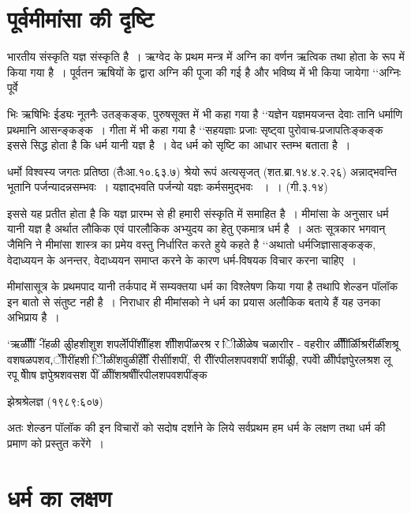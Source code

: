 {\section*{पूर्वमीमांसा की दृष्टि}

भारतीय संस्कृति यज्ञ संस्कृति है~। ऋग्वेद के प्रथम मन्त्र में अग्नि का वर्णन ऋत्विक तथा होता के रूप में किया गया है~। पूर्वतन ऋषियों के द्वारा अग्नि की पूजा की गई है और भविष्य में भी किया जायेगा ‘‘अग्निः पूर्वे

भिः ऋषिभिः ईड्यः नूतनैः उतङ्कङ्क, पुरुषसूक्त में भी कहा गया है ‘‘यज्ञेन यज्ञमयजन्त देवाः तानि धर्माणि प्रथमानि आसन्ङ्कङ्क~। गीता में भी कहा गया है ‘‘सहयज्ञाः प्रजाः सृष्ट्वा पुरोवाच-प्रजापतिःङ्कङ्क इससे सिद्ध होता है कि धर्म यानी यज्ञ है~। वेद धर्म को सृष्टि का आधार स्तम्भ बताता है~।

	धर्मो विश्वस्य जगतः प्रतिष्ठा (तैःआ.१०.६३.७)
	श्रेयो रूपं अत्यसृजत् (शत.ब्रा.१४.४.२.२६)
	अन्नाद्भवन्ति भूतानि पर्जन्यादन्नसम्भवः~।
	यज्ञाद्भवति पर्जन्यो यज्ञः कर्मसमुद्भवः ~।~। (गी.३.१४)

इससे यह प्रतीत होता है कि यज्ञ प्रारम्भ से ही हमारी संस्कृति में समाहित है~। मीमांसा के अनुसार धर्म यानी यज्ञ है अर्थात लौकिक एवं पारलौकिक अभ्युदय का हेतु एकमात्र धर्म है~। अतः सूत्रकार भगवान् जैमिनि ने मीमांसा शास्त्र का प्रमेय वस्तु निर्धारित करते हुये कहते है ‘‘अथातो धर्मजिज्ञासाङ्कङ्क, वेदाध्ययन के अनन्तर, वेदाध्ययन समाप्त करने के कारण धर्म-विषयक विचार करना चाहिए~।

मीमांसासूत्र के प्रथमपाद यानी तर्कपाद में सम्यक्तया धर्म का विश्लेषण किया गया है तथापि शेल्डन पॉलॉक इन बातो से संतुष्ट नही है~। निराधार ही मीमांसको ने धर्म का प्रयास अलौकिक बताये हैं यह उनका अभिप्राय है~।

‘ऋळीीीं -ींहळी ळीुहशीशुश शपर्लेीपींशीींहश शीीशपींळरश्र र िीळेीळेष चळाराीर - वहरीार ळीीींर्ळिीश्ररींर्ळींशश्रू वशषळपशव,ेीीरींहशी िेीळींशवुळींर्हेीीं रीर्सीाशपीं, री रीींरपीलशपवशपीं शपींळीूं, रपवीे ळीीर्पज्ञपेुरलश्रश लू रपू षेीाेष ज्ञपेुश्रशवसश पेीं ळीींशश्रषीींरपीलशपवशपींङ्क 					    

     झेश्रश्रेलज्ञ (१९८९:६०७)

अतः शेल्डन पॉलॉक की इन विचारों को सदोष दर्शाने के लिये सर्वप्रथम हम धर्म के लक्षण तथा धर्म की प्रमाण को प्रस्तुत करेंगे~।

\section*{धर्म का लक्षण}

}
